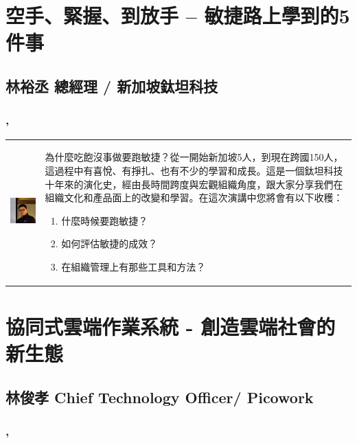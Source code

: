 \documentclass[12pt,oneside,a4paper]{book}
\begin{document}
\section*{空手、緊握、到放手 – 敏捷路上學到的5件事} 
\subsection*{林裕丞 總經理 / 新加坡鈦坦科技} 
\subsubsection*{\TimeIndustryOne, \LocationIndustryOne}

\begin{tabular}{l m{12cm}}
	\begin{minipage}{4.5cm}
		\includegraphics[width=4.2cm]{images/yves.jpg}   
    \end{minipage}
	&    
	為什麼吃飽沒事做要跑敏捷？從一開始新加坡5人，到現在跨國150人，這過程中有喜悅、有掙扎、也有不少的學習和成長。這是一個鈦坦科技十年來的演化史，經由長時間跨度與宏觀組織角度，跟大家分享我們在組織文化和產品面上的改變和學習。在這次演講中您將會有以下收穫：
\begin{enumerate}
\item 什麼時候要跑敏捷？
\item 如何評估敏捷的成效？
\item 在組織管理上有那些工具和方法？
\end{enumerate} 
\end{tabular}

\section*{協同式雲端作業系統 - 創造雲端社會的新生態} 
\subsection*{林俊孝 Chief Technology Officer/ Picowork} 
\subsubsection*{\TimeIndustryTwo, \LocationIndustryTwo}
\end{document}
